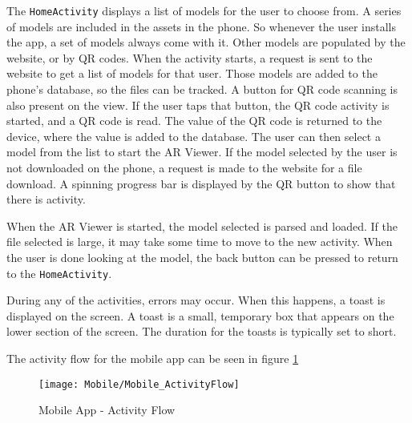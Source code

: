             The \texttt{HomeActivity} displays a list of models for the user to choose from.  A series of models are included in the assets in the phone.  So whenever the user installs the app, a set of models always come with it.  Other models are populated by the website, or by QR codes.  When the activity starts, a request is sent to the website to get a list of models for that user.  Those models are added to the phone's database, so the files can be tracked.  A button for QR code scanning is also present on the view.  If the user taps that button, the QR code activity is started, and a QR code is read.  The value of the QR code is returned to the device, where the value is added to the database.  The user can then select a model from the list to start the AR Viewer.  If the model selected by the user is not downloaded on the phone, a request is made to the website for a file download.  A spinning progress bar is displayed by the QR button to show that there is activity.

            When the AR Viewer is started, the model selected is parsed and loaded.  If the file selected is large, it may take some time to move to the new activity.  When the user is done looking at the model, the back button can be pressed to return to the \texttt{HomeActivity}.
            
            During any of the activities, errors may occur.  When this happens, a toast is displayed on the screen.  A toast is a small, temporary box that appears on the lower section of the screen.  The duration for the toasts is typically set to short. 

            The activity flow for the mobile app can be seen in figure \ref{fig:mobileActivityFlow}

            \begin{figure}[H]
                \texttt{[image: Mobile/Mobile\_ActivityFlow]}
                \centering
                \caption{Mobile App - Activity Flow}
                \label{fig:mobileActivityFlow}
            \end{figure}

